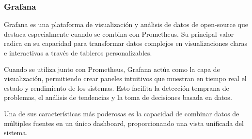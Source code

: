 \newpage

\subsubsection{Grafana}
Grafana es una plataforma de visualización y análisis de datos de open-source que destaca especialmente cuando se combina con Prometheus. 
Su principal valor radica en su capacidad para transformar datos complejos en visualizaciones claras e interactivas a través de tableros personalizables.\newline

Cuando se utiliza junto con Prometheus, Grafana actúa como la capa de visualización, permitiendo crear paneles intuitivos que muestran en tiempo real el estado y rendimiento de los sistemas. 
Esto facilita la detección temprana de problemas, el análisis de tendencias y la toma de decisiones basada en datos. \newline

Una de sus características más poderosas es la capacidad de combinar datos de múltiples fuentes en un único dashboard, proporcionando una vista unificada del sistema. 

\newpage
